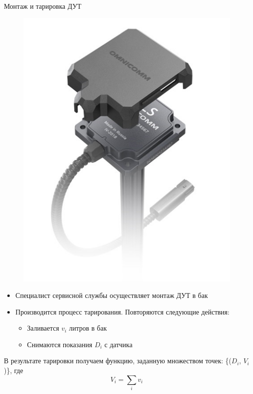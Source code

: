 \documentclass[usenames,dvipsnames,11pt]{beamer}
\begin{document}
\begin{frame}{Монтаж и тарировка ДУТ}
	\begin{minipage}[h]{0.39\linewidth}
		\begin{figure}
		\centering
		\includegraphics[width=1\linewidth]{graphics/screenshot002}
		\end{figure}
	\end{minipage}
	\hfill
	\begin{minipage}[h]{0.59\linewidth}
		\begin{itemize}
			\item Специалист сервисной службы осуществляет монтаж ДУТ в бак
			\item Производится процесс тарирования. Повторяются следующие действия:
			\begin{itemize}
			\item Заливается $v_i$ литров в бак
			\item Снимаются показания $D_i$ с датчика
			\end{itemize}
		\end{itemize}
		В результате тарировки получаем функцию, заданную множеством точек:
		\{($D_i$, $V_i$)\},
		где $$V_i = \sum_{i}v_i$$
	\end{minipage}
\end{frame}
\end{document}
